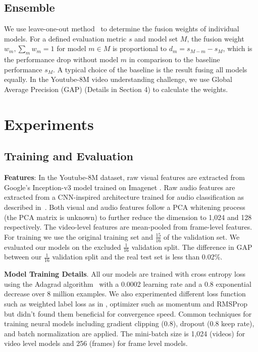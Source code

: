 \documentclass[10pt,twocolumn,letterpaper]{article}
\begin{document}

\subsection{Ensemble}
We use leave-one-out method~\cite{lan2013cmu} to determine the fusion weights of individual models. For a defined evaluation metric $s$ and model set $M$, the fusion weight $w_m, \sum_m w_m = 1$ for model $m \in M$ is proportional to $d_m = s_{M-m} - s_{M}$, which is the performance drop without model $m$ in comparison to the baseline performance $s_{M}$. A typical choice of the baseline is the result fusing all models equally. In the Youtube-8M video understanding challenge, we use Global Average Precision (GAP) (Details in Section 4) to calculate the weights.




\section{Experiments}
\subsection{Training and Evaluation}

\textbf{Features}: In the Youtube-8M dataset, raw visual features are extracted from Google's Inception-v3 model trained on Imagenet \cite{szegedy2016rethinking}. Raw audio features are extracted from a CNN-inspired architecture trained for audio classification as described in~\cite{hershey2017cnn}. Both visual and audio features follow a PCA whitening process (the PCA matrix is unknown) to further reduce the dimension to 1,024 and 128 respectively. The video-level features are mean-pooled from frame-level features. For training we use the original training set and $\frac{15}{16}$ of the validation set. We evaluated our models on the excluded $\frac{1}{16}$ validation split. The difference in GAP between our $\frac{1}{16}$ validation split and the real test set is less than 0.02\%.

\textbf{Model Training Details}. All our models are trained with cross entropy loss using the Adagrad algorithm~\cite{duchi2011adaptive} with a 0.0002 learning rate and a 0.8 exponential decrease over 8 million examples. We also experimented different loss function such as weighted label loss as in \cite{natarajan2013learning}, optimizer such as momentum and RMSProp but didn't found them beneficial for convergence speed. Common techniques for training neural models including gradient clipping (0.8), dropout (0.8 keep rate), and batch normalization are applied. The mini-batch size is 1,024 (videos) for video level models and 256 (frames) for frame level models.
\end{document}
